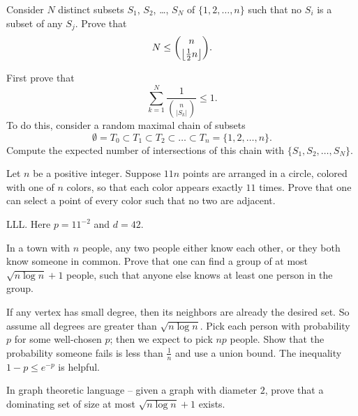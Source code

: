 \documentclass[11pt]{scrartcl}
\begin{document}
\begin{problem}
  [Sperner] Consider $N$ distinct subsets $S_1$, $S_2$, \dots, $S_N$ of $\{1,2,\dots,n\}$ such that no $S_i$
  is a subset of any $S_j$.
  Prove that
  \[ N \le \binom{n}{\left\lfloor \frac{1}{2} n \right\rfloor}. \]
  \begin{sketch}
    First prove that \[ \sum_{k=1}^N \frac{1}{\binom{n}{\left\lvert S_k \right\rvert}} \le 1. \]
    To do this, consider a random maximal chain of subsets
    \[ \emptyset = T_0 \subset T_1 \subset T_2 \subset \dots \subset T_n = \{1,2,\dots,n\}. \]
    Compute the expected number of intersections of this chain with $\{S_1, S_2, \dots, S_N\}$.
  \end{sketch}
\end{problem}

\begin{problem}
  Let $n$ be a positive integer. Suppose $11n$ points are arranged in a circle,
  colored with one of $n$ colors, so that
  each color appears exactly $11$ times.
  Prove that one can select a point of every color such that no two are adjacent.
  \begin{sketch}
    LLL. Here $p = 11^{-2}$ and $d = 42$.
  \end{sketch}
\end{problem}

\begin{problem}
  In a town with $n$ people, any two people either know each other, or they both know someone in common.
  Prove that one can find a group of at most $\sqrt{n \log n} + 1$ people, such that anyone else knows
  at least one person in the group.
  \begin{sketch}
    If any vertex has small degree, then its neighbors are already the desired set.
    So assume all degrees are greater than $\sqrt{n \log n}$.
    Pick each person with probability $p$ for some well-chosen $p$; then we expect to pick $np$ people.
    Show that the probability someone fails is less than $\frac 1n$ and use a union bound.
    The inequality $1-p \le e^{-p}$ is helpful.
  \end{sketch}
\end{problem}
\begin{remark*}
  In graph theoretic language -- given a graph with diameter $2$, prove that a dominating set of
  size at most $\sqrt{n \log n} + 1$ exists.
\end{remark*}
\end{document}
